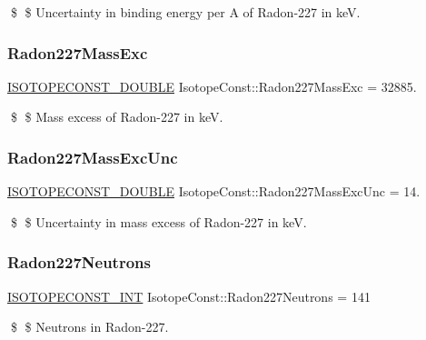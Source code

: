 \$ \$ Uncertainty in binding energy per A of Radon-\/227 in keV. \mbox{\label{group___isotope_const-_radon-_rn227_ga3136399b67412ee2270f86036de260c5}} 
\subsubsection{\texorpdfstring{Radon227\+Mass\+Exc}{Radon227MassExc}}
{\footnotesize\ttfamily \mbox{\hyperlink{group___isotope_const-_macros_ga8f45a7272ce02c0b4c65c44636ed719a}{I\+S\+O\+T\+O\+P\+E\+C\+O\+N\+S\+T\+\_\+\+D\+O\+U\+B\+LE}} Isotope\+Const\+::\+Radon227\+Mass\+Exc = 32885.}

\$ \$ Mass excess of Radon-\/227 in keV. \mbox{\label{group___isotope_const-_radon-_rn227_ga3161f2cc3cb753380915d352208e8098}} 
\subsubsection{\texorpdfstring{Radon227\+Mass\+Exc\+Unc}{Radon227MassExcUnc}}
{\footnotesize\ttfamily \mbox{\hyperlink{group___isotope_const-_macros_ga8f45a7272ce02c0b4c65c44636ed719a}{I\+S\+O\+T\+O\+P\+E\+C\+O\+N\+S\+T\+\_\+\+D\+O\+U\+B\+LE}} Isotope\+Const\+::\+Radon227\+Mass\+Exc\+Unc = 14.}

\$ \$ Uncertainty in mass excess of Radon-\/227 in keV. \mbox{\label{group___isotope_const-_radon-_rn227_gabdfa075e1e4d79d49aad8cf054e34c84}} 
\subsubsection{\texorpdfstring{Radon227\+Neutrons}{Radon227Neutrons}}
{\footnotesize\ttfamily \mbox{\hyperlink{group___isotope_const-_macros_ga5f18360b3e99483a35c32d789e62621c}{I\+S\+O\+T\+O\+P\+E\+C\+O\+N\+S\+T\+\_\+\+I\+NT}} Isotope\+Const\+::\+Radon227\+Neutrons = 141}

\$ \$ Neutrons in Radon-\/227. \mbox{\label{group___isotope_const-_radon-_rn227_ga8f5324f691cb4b610fbbe3853fc83da7}} 
